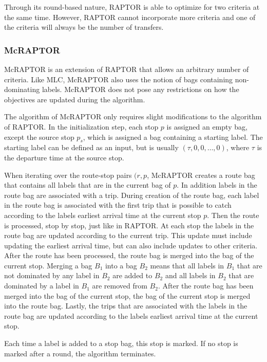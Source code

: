 Through its round-based nature, RAPTOR is able to optimize for two criteria at the same time.
However, RAPTOR cannot incorporate more criteria and one of the criteria will always be the number of transfers.


\subsubsection{McRAPTOR}
\label{subsubsec:mcraptor}

McRAPTOR \cite{dellingRoundBasedPublicTransit2015} is an extension of RAPTOR that allows an arbitrary number of criteria.
Like MLC, McRAPTOR also uses the notion of bags containing non-dominating labels.
McRAPTOR does not pose any restrictions on how the objectives are updated during the algorithm.

The algorithm of McRAPTOR only requires slight modifications to the algorithm of RAPTOR.
In the initialization step, each stop \(p\) is assigned an empty bag, except the source stop \(p_s\), which is assigned a bag containing a starting label.
The starting label can be defined as an input, but is usually \((\tau, 0, 0, \dots, 0)\), where \(\tau\) is the departure time at the source stop.

When iterating over the route-stop pairs \((r, p\), McRAPTOR creates a route bag that contains all labels that are in the current bag of \(p\).
In addition labels in the route bag are associated with a trip.
During creation of the route bag, each label in the route bag is associated with the first trip that is possible to catch according to the labels earliest arrival time at the current stop \(p\).
Then the route is processed, stop by stop, just like in RAPTOR.
At each stop the labels in the route bag are updated according to the current trip.
This update must include updating the earliest arrival time, but can also include updates to other criteria.
After the route has been processed, the route bag is merged into the bag of the current stop.
Merging a bag \(B_1\) into a bag \(B_2\) means that all labels in \(B_1\) that are not dominated by any label in \(B_2\) are added to \(B_2\) and all labels in \(B_2\) that are dominated by a label in \(B_1\) are removed from \(B_2\).
After the route bag has been merged into the bag of the current stop, the bag of the current stop is merged into the route bag.
Lastly, the trips that are associated with the labels in the route bag are updated according to the labels earliest arrival time at the current stop.

Each time a label is added to a stop bag, this stop is marked.
If no stop is marked after a round, the algorithm terminates.

